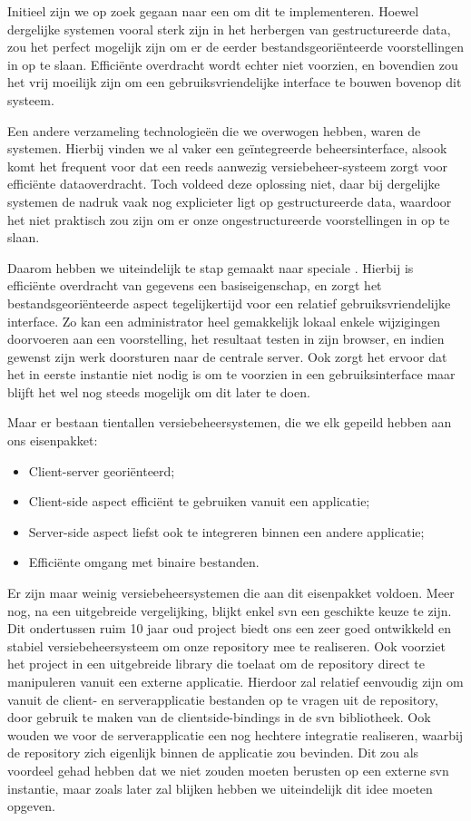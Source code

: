 Initieel zijn we op zoek gegaan naar een  om dit te implementeren. Hoewel dergelijke systemen vooral sterk zijn in het herbergen van gestructureerde data, zou het perfect mogelijk zijn om er de eerder bestandsgeoriënteerde voorstellingen in op te slaan. Efficiënte overdracht wordt echter niet voorzien, en bovendien zou het vrij moeilijk zijn om een gebruiksvriendelijke interface te bouwen bovenop dit systeem.

Een andere verzameling technologieën die we overwogen hebben, waren de  systemen. Hierbij vinden we al vaker een geïntegreerde beheersinterface, alsook komt het frequent voor dat een reeds aanwezig versiebeheer-systeem zorgt voor efficiënte dataoverdracht. Toch voldeed deze oplossing niet, daar bij dergelijke systemen de nadruk vaak nog explicieter ligt op gestructureerde data, waardoor het niet praktisch zou zijn om er onze ongestructureerde voorstellingen in op te slaan.

Daarom hebben we uiteindelijk te stap gemaakt naar speciale . Hierbij is efficiënte overdracht van gegevens een basiseigenschap, en zorgt het bestandsgeoriënteerde aspect tegelijkertijd voor een relatief gebruiksvriendelijke interface. Zo kan een administrator heel gemakkelijk lokaal enkele wijzigingen doorvoeren aan een voorstelling, het resultaat testen in zijn browser, en indien gewenst zijn werk doorsturen naar de centrale server. Ook zorgt het ervoor dat het in eerste instantie niet nodig is om te voorzien in een gebruiksinterface maar blijft het wel nog steeds mogelijk om dit later te doen.

Maar er bestaan tientallen versiebeheersystemen, die we elk gepeild hebben aan ons eisenpakket:
\begin{itemize}
\item Client-server georiënteerd;
\item Client-side aspect efficiënt te gebruiken vanuit een applicatie;
\item Server-side aspect liefst ook te integreren binnen een andere applicatie;
\item Efficiënte omgang met binaire bestanden.
\end{itemize}

Er zijn maar weinig versiebeheersystemen die aan dit eisenpakket voldoen. Meer nog, na een uitgebreide vergelijking, blijkt enkel \ac{svn} een geschikte keuze te zijn. Dit ondertussen ruim 10 jaar oud project biedt ons een zeer goed ontwikkeld en stabiel versiebeheersysteem om onze repository mee te realiseren. Ook voorziet het project in een uitgebreide library die toelaat om de repository direct te manipuleren vanuit een externe applicatie. Hierdoor zal relatief eenvoudig zijn om vanuit de client- en serverapplicatie bestanden op te vragen uit de repository, door gebruik te maken van de clientside-bindings in de \ac{svn} bibliotheek. Ook wouden we voor de serverapplicatie een nog hechtere integratie realiseren, waarbij de repository zich eigenlijk binnen de applicatie zou bevinden. Dit zou als voordeel gehad hebben dat we niet zouden moeten berusten op een externe \ac{svn} instantie, maar zoals later zal blijken hebben we uiteindelijk dit idee moeten opgeven.

